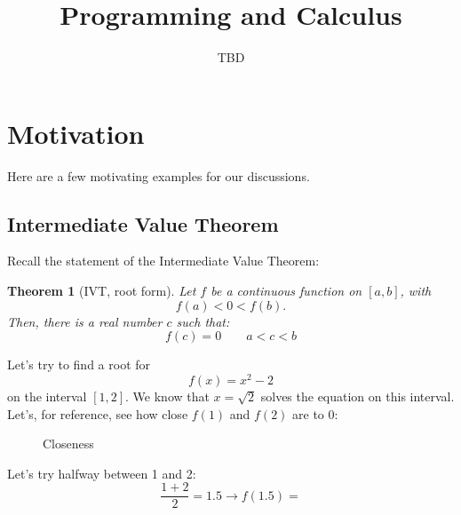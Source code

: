 \documentclass{article}
\title{Programming and Calculus}
\date{TBD}
\newtheorem{theorem}{Theorem}
\begin{document}
    \maketitle
    \section{Motivation}
    Here are a few motivating examples for our discussions.
    \subsection{Intermediate Value Theorem}
    Recall the statement of the Intermediate Value Theorem:
        \begin{theorem}[IVT, root form]
            Let $f$ be a continuous function on $[a,b]$, with 
            \[f(a)<0<f(b).\]
            Then, there is a real number $c$ such that:
            \[f(c)=0\quad\quad a<c<b\]
        \end{theorem} 
    Let's try to find a root for
    \[f(x)=x^2 - 2\]
    on the interval $[1,2]$. We know that $x=\sqrt{2}$ solves the equation on this interval. 
    Let's, for reference, see how close $f(1)$ and $f(2)$ are to 0:
    \begin{figure}
        \centering
        \begin{comment}
            \begin{tikzpicture}
                \draw[thick,<->] 
            \end{tikzpiture}
        \end{comment}
        \caption{Closeness}
    \end{figure}   
    Let's try halfway between 1 and 2:
    \[\dfrac{1+2}{2}=1.5\to f(1.5)=\]
\end{document}

